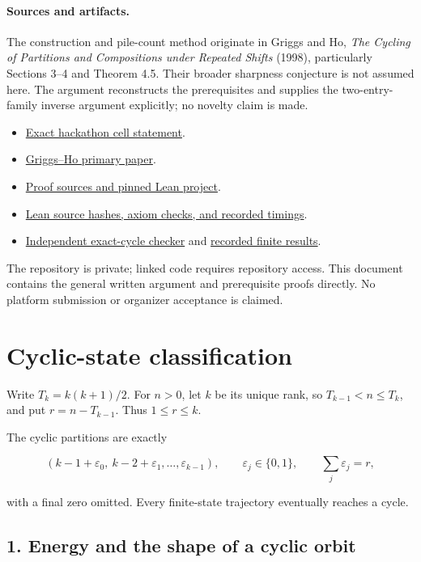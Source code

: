 \documentclass[11pt,a4paper]{article}
\begin{document}
\paragraph{Sources and artifacts.}
The construction and pile-count method originate in Griggs and Ho, \emph{The Cycling of Partitions and Compositions under Repeated Shifts} (1998), particularly Sections 3--4 and Theorem 4.5. Their broader sharpness conjecture is not assumed here. The argument reconstructs the prerequisites and supplies the two-entry-family inverse argument explicitly; no novelty claim is made.
\begin{itemize}
\item \href{https://hackathon.bainsa.ai/p/p3/c5}{Exact hackathon cell statement}.
\item \href{https://people.math.sc.edu/griggs/cycling.pdf}{Griggs--Ho primary paper}.
\item \href{https://github.com/mpelteshki/climbing-to-the-frontier/tree/main/cagent/p3}{Proof sources and pinned Lean project}.
\item \href{https://github.com/mpelteshki/climbing-to-the-frontier/blob/main/cagent/p3/evidence/verification.json}{Lean source hashes, axiom checks, and recorded timings}.
\item \href{https://github.com/mpelteshki/climbing-to-the-frontier/blob/main/cagent/p3/c5/check.py}{Independent exact-cycle checker} and \href{https://github.com/mpelteshki/climbing-to-the-frontier/blob/main/cagent/p3/c5/finite-check.json}{recorded finite results}.
\end{itemize}
The repository is private; linked code requires repository access. This document contains the general written argument and prerequisite proofs directly. No platform submission or organizer acceptance is claimed.
\appendix
\section{Cyclic-state classification}
Write $T_k=k(k+1)/2$. For $n>0$, let $k$ be its unique rank, so $T_{k-1}<n\le T_k$, and put $r=n-T_{k-1}$. Thus $1\le r\le k$.

The cyclic partitions are exactly

\[
(k-1+\varepsilon_0,\ k-2+\varepsilon_1,\ldots,\varepsilon_{k-1}),
\qquad \varepsilon_j\in\{0,1\},\qquad \sum_j\varepsilon_j=r,
\]

with a final zero omitted. Every finite-state trajectory eventually reaches a cycle.

\subsection{1. Energy and the shape of a cyclic orbit}
\end{document}
